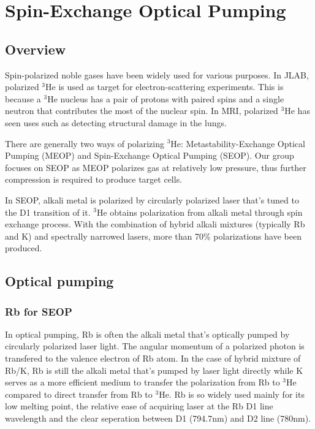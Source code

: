 \chapter{Spin-Exchange Optical Pumping}
\label{chap2}

\section{Overview}

Spin-polarized noble gases have been widely used for various purposes. In JLAB, polarized $^{3}$He is used as target for electron-scattering experiments. This is because a $^{3}$He nucleus has a pair of protons with paired spins and a single neutron that contributes the most of the nuclear spin. In MRI, polarized $^{3}$He has seen uses such as detecting structural damage in the lungs.

There are generally two ways of polarizing $^{3}$He: Metastability-Exchange Optical Pumping (MEOP) and Spin-Exchange Optical Pumping (SEOP). Our group focuses on SEOP as MEOP polarizes gas at relatively low pressure, thus further compression is required to produce target cells.

In SEOP, alkali metal is polarized by circularly polarized laser that's tuned to the D1 transition of it. $^{3}$He obtains polarization from alkali metal through spin exchange process. With the combination of hybrid alkali mixtures (typically Rb and K) and spectrally narrowed lasers, more than 70\% polarizations have been produced.

\section{Optical pumping}

\subsection{Rb for SEOP}

In optical pumping, Rb is often the alkali metal that's optically pumped by circularly polarized laser light. The angular momentum of a polarized photon is transfered to the valence electron of Rb atom. In the case of hybrid mixture of Rb/K, Rb is still the alkali metal that's pumped by laser light directly while K serves as a more efficient medium to transfer the polarization from Rb to $^{3}$He compared to direct transfer from Rb to $^{3}$He. Rb is so widely used mainly for its low melting point, the relative ease of acquiring laser at the Rb D1 line wavelength and the clear seperation between D1 (794.7nm) and D2 line (780nm). 

